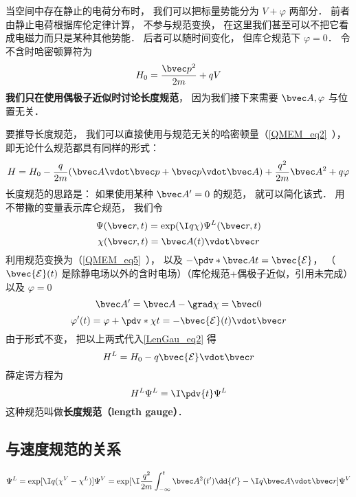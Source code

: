 
\begin{issues}
\issueTODO
\end{issues}


当空间中存在静止的电荷分布时， 我们可以把标量势能分为 $V + \varphi$ 两部分． 前者由静止电荷根据库伦定律计算， 不参与规范变换， 在这里我们甚至可以不把它看成电磁力而只是某种其他势能． 后者可以随时间变化， 但库仑规范下 $\varphi = 0$． 令不含时哈密顿算符为
\begin{equation}
H_0 = \frac{\bvec p^2}{2m} + qV
\end{equation}
\textbf{我们只在使用偶极子近似时讨论长度规范}， 因为我们接下来需要 $\bvec A, \varphi$ 与位置无关．

要推导长度规范， 我们可以直接使用与规范无关的哈密顿量（\autoref{QMEM_eq2}~）， 即无论什么规范都具有同样的形式：
\begin{equation}\label{LenGau_eq2}
H = H_0 - \frac{q}{2m} (\bvec A \vdot \bvec p + \bvec p \vdot \bvec A)
+ \frac{q^2}{2m} \bvec A^2 + q \varphi
\end{equation}
长度规范的思路是： 如果使用某种 $\bvec A' = 0$ 的规范， 就可以简化该式． 用不带撇的变量表示库仑规范， 我们令
\begin{equation}
\Psi(\bvec r, t) = \exp(\I q\chi)\Psi^L(\bvec r, t)
\end{equation}
\begin{equation}
\chi(\bvec r, t) = \bvec A(t) \vdot \bvec r
\end{equation}
利用规范变换为（\autoref{QMEM_eq5}~）， 以及 $-\pdv*{\bvec A}{t} = \bvec {\mathcal E}$， （$\bvec {\mathcal E}(t)$ 是除静电场以外的含时电场）（库伦规范+偶极子近似，引用未完成）以及 $\varphi = 0$
\begin{equation}
\bvec A' = \bvec A - \grad \chi = \bvec 0
\end{equation}
\begin{equation}
\varphi'(t) = \varphi + \pdv*{\chi}{t} = -\bvec {\mathcal E}(t) \vdot \bvec r
\end{equation}
由于形式不变， 把以上两式代入\autoref{LenGau_eq2} 得
\begin{equation}
H^L = H_0 - q\bvec{\mathcal{E}} \vdot \bvec r
\end{equation}
薛定谔方程为
\begin{equation}
H^L \Psi^L = \I \pdv{t} \Psi^L
\end{equation}
这种规范叫做\textbf{长度规范（length gauge）}．

\subsection{与速度规范的关系}
\begin{equation}
\Psi^L = \exp[\I q(\chi^V - \chi^L)]\Psi^V = \exp[\I\frac{q^2}{2m}\int_{-\infty}^t \bvec A^2(t')\dd{t'} - \I q \bvec A\vdot \bvec r] \Psi^V
\end{equation}
